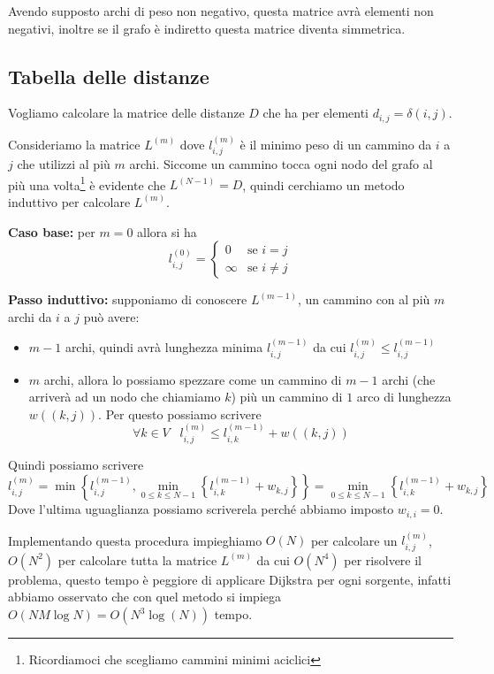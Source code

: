 \documentclass[a4paper,10pt]{amsbook}
\theoremstyle{plain}
\theoremstyle{definition}
\theoremstyle{remark}
\newcommand{\set}[1]{\left\{#1\right\}}
\newcommand{\pa}[1]{\left(#1\right)}
\begin{document}
Avendo supposto archi di peso non negativo, questa matrice avrà
elementi non negativi, inoltre se il grafo è indiretto questa matrice
diventa simmetrica.

\subsection{Tabella delle distanze}


Vogliamo calcolare la matrice delle distanze $D$ che ha per elementi
$d_{i,j} = \delta(i,j)$.

Consideriamo la matrice $L^{(m)}$ dove $l^{(m)}_{i,j}$ è il minimo
peso di un cammino da $i$ a $j$ che utilizzi al più $m$ archi. Siccome
un cammino tocca ogni nodo del grafo al pi\`u una
volta\footnote{Ricordiamoci che scegliamo cammini minimi aciclici} \`e
evidente che $L^{(N-1)} = D$, quindi cerchiamo un metodo induttivo per
calcolare $L^{(m)}$.

\textbf{Caso base:} per $m=0$ allora si ha
\[ l^{(0)} _{i,j} = \left\{
  \begin{matrix}
    0 & \text{se } i = j\\
    \infty & \text{se } i \neq j
  \end{matrix}
  \right.
\]

\textbf{Passo induttivo:} supponiamo di conoscere $L^{(m-1)}$, un
cammino con al più $m$ archi da $i$ a $j$ può avere:
\begin{itemize}
\item $m-1$ archi, quindi avrà lunghezza minima $l^{(m-1)}
  _{i,j}$ da cui $l^{(m)}_{i,j} \le l^{(m-1)} _{i,j}$
\item $m$ archi, allora lo possiamo spezzare come un cammino di
  $m-1$ archi (che arriverà ad un nodo che chiamiamo $k$) più un
  cammino di $1$ arco di lunghezza $w\pa{(k,j)}$. Per questo possiamo
  scrivere 
  \[ \forall k \in V\;\;\; l^{(m)}_{i,j} \le l^{(m-1)} _{i,k} + w\pa{
    (k,j) } \]
\end{itemize}
Quindi possiamo scrivere
\[ l^{(m)}_{i,j} = \min\set{ l^{(m-1)} _{i,j} , \min _{0\le k\le N-1}
  \set{ l^{(m-1)} _{i,k} + w_{k,j}} }  =  \min _{0\le k\le N-1}
  \set{ l^{(m-1)} _{i,k} + w_{k,j}} \]
Dove l'ultima uguaglianza possiamo scriverela perché abbiamo imposto
$w_{i,i} = 0$.

Implementando questa procedura impieghiamo $O(N)$ per calcolare un
$l^{(m)}_{i,j}$, $O(N^2)$ per calcolare tutta la matrice $L^{(m)}$ da
cui $O(N^4)$ per risolvere il problema, questo tempo è peggiore di
applicare Dijkstra per ogni sorgente, infatti abbiamo osservato che
con quel metodo si impiega $O(NM\log N) = O( N^3 \log (N) )$ tempo.
\end{document}
